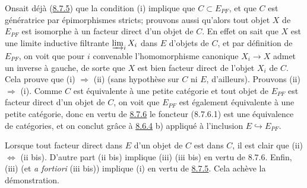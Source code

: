 On\pageoriginale sait déjà (\hyperref[I.prop8.7.5]{8.7.5}) que la condition (i)
implique que $C\subset E_{PF}$, et que $C$ est génératrice par
épimorphismes stricts; prouvons aussi qu'alors tout objet $X$ de
$E_{PF}$ est isomorphe à un facteur direct d'un objet de $C$. En
effet on sait que $X$ est une limite inductive filtrante
$\varinjlim_i X_i$ dans $E$ d'objets de $C$, et par définition de
$E_{PF}$, on voit que pour $i$ convenable l'homomorphisme canonique
$X_i\rightarrow X$ admet un inverse à gauche, de sorte que $X$ est
bien facteur direct de l'objet $X_i$ de $C$. Cela prouve que (i)
$\Rightarrow$ (ii) (sans hypothèse sur $C$ ni $E$, d'ailleurs).
Prouvons (ii) $\Rightarrow$ (i). Comme $C$ est équivalente à une
petite catégorie et tout objet de $E_{PF}$ est facteur direct d'un
objet de $C$, on voit que $E_{PF}$ est également équivalente à une
petite catégorie, donc en vertu de \hyperref[I.cor8.7.6]{8.7.6} le foncteur
(8.7.6.1) est une équivalence de catégories, et on conclut
grâce à \hyperref[I.prop8.6.4]{8.6.4} b) appliqué à l'inclusion
$E\hookrightarrow E_{PF}$.

Lorsque tout facteur direct dans $E$ d'un objet de $C$ est dans $C$,
il est clair que (ii) $\Leftrightarrow$ (ii bis). D'autre part (ii
bis) implique (iii) \resp (iii bis) en vertu de 8.7.6. Enfin, (iii)
(et \textit{a fortiori} (iii bis)) implique (i) en vertu de
\hyperref[I.prop8.7.5]{8.7.5}. Cela achève la démonstration.

